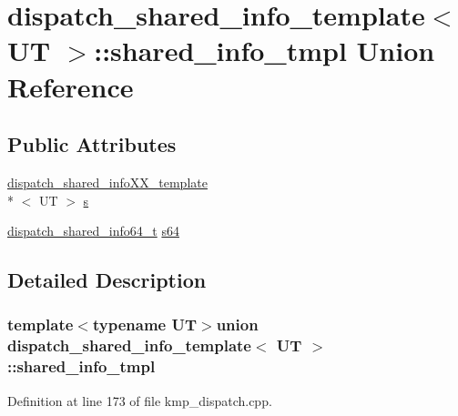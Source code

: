 \hypertarget{uniondispatch__shared__info__template_1_1shared__info__tmpl}{\section{dispatch\-\_\-shared\-\_\-info\-\_\-template$<$ U\-T $>$\-:\-:shared\-\_\-info\-\_\-tmpl Union Reference}
\label{uniondispatch__shared__info__template_1_1shared__info__tmpl}
}
\subsection*{Public Attributes}
\begin{DoxyCompactItemize}
\item 
\hyperlink{structdispatch__shared__infoXX__template}{dispatch\-\_\-shared\-\_\-info\-X\-X\-\_\-template}\\*
$<$ U\-T $>$ \hyperlink{uniondispatch__shared__info__template_1_1shared__info__tmpl_ad685051b57b2ee1fd685f627a04621ef}{s}
\item 
\hyperlink{kmp_8h_a8a97d7549f6b7fa3ec64e933bd434fd5}{dispatch\-\_\-shared\-\_\-info64\-\_\-t} \hyperlink{uniondispatch__shared__info__template_1_1shared__info__tmpl_afcaf714880dfcdedb3d9e4dc9b6320a0}{s64}
\end{DoxyCompactItemize}


\subsection{Detailed Description}
\subsubsection*{template$<$typename U\-T$>$union dispatch\-\_\-shared\-\_\-info\-\_\-template$<$ U\-T $>$\-::shared\-\_\-info\-\_\-tmpl}



Definition at line 173 of file kmp\-\_\-dispatch.\-cpp.



